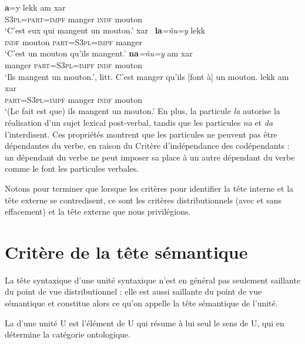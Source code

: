 \ea\label{ex:wolof-particules}
\ea
{}\textbf{{a}}{=y}                {lekk}          {am}       {xar~}\\
\textsc{S3pl=part=impf} manger  \textsc{indf}  mouton\\
\glt `C’est eux qui mangent un mouton.’
\ex
{}       {xar~}          \textbf{{la}}\textit{=ñu=y}               {lekk}\\
\textsc{indf}  mouton  \textsc{part=S3pl=impf} manger\\
\glt `C’est un mouton qu’ils mangent.’
\ex
{}       \textbf{{na}}\textit{=ñu=y}             {am}       {xar~}\\
manger  \textsc{part=S3pl=impf} \textsc{indf}  mouton\\
\glt `Ils mangent un mouton.’, litt. C'est manger qu'ils [font à] un mouton.
\ex
{}   lekk         am      xar\\
\textsc{part=S3pl=impf}    manger  \textsc{indf}  mouton\\
\glt `(Le fait est que) ils mangent un mouton.’
\z
\z
En plus, la particule \textit{la} autorise la réalisation d’un sujet lexical post-verbal, tandis que les particules \textit{na} et \textit{da} l’interdisent. Ces propriétés montrent que les particules ne peuvent pas être dépendantes du verbe, en raison du Critère d’indépendance des codépendants : un dépendant du verbe ne peut imposer sa place à un autre dépendant du verbe comme le font les particules verbales.

Notons pour terminer que lorsque les critères pour identifier la tête interne et la tête externe se contredisent, ce sont les critères distributionnels (avec et sans effacement) et la tête externe que nous privilégions.

\section{Critère de la tête sémantique}\label{sec:3.3.17}
\begin{sloppypar}
La tête syntaxique d’une unité syntaxique n’est en général pas seulement saillante du point de vue distributionnel : elle est aussi saillante du point de vue sémantique et constitue alors ce qu’on appelle la tête sémantique de l’unité.
\end{sloppypar}

{La  d’une unité U est l’élément de U qui résume à lui seul le sens de U, qui en détermine la catégorie ontologique.}

